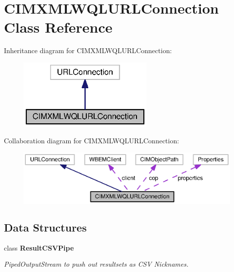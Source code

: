 \section{C\+I\+M\+X\+M\+L\+W\+Q\+L\+U\+R\+L\+Connection Class Reference}
\label{classorg_1_1smallfoot_1_1parser_1_1cimcql_1_1CIMXMLWQLURLConnection}


Inheritance diagram for C\+I\+M\+X\+M\+L\+W\+Q\+L\+U\+R\+L\+Connection\+:
\nopagebreak
\begin{figure}[H]
\begin{center}
\leavevmode
\includegraphics[width=190pt]{classorg_1_1smallfoot_1_1parser_1_1cimcql_1_1CIMXMLWQLURLConnection__inherit__graph}
\end{center}
\end{figure}


Collaboration diagram for C\+I\+M\+X\+M\+L\+W\+Q\+L\+U\+R\+L\+Connection\+:
\nopagebreak
\begin{figure}[H]
\begin{center}
\leavevmode
\includegraphics[width=350pt]{classorg_1_1smallfoot_1_1parser_1_1cimcql_1_1CIMXMLWQLURLConnection__coll__graph}
\end{center}
\end{figure}
\subsection*{Data Structures}
\begin{DoxyCompactItemize}
\item 
class {\bf Result\+C\+S\+V\+Pipe}
\begin{DoxyCompactList}\small\item\em Piped\+Output\+Stream to push out resultsets as C\+S\+V Nicknames. \end{DoxyCompactList}\end{DoxyCompactItemize}
